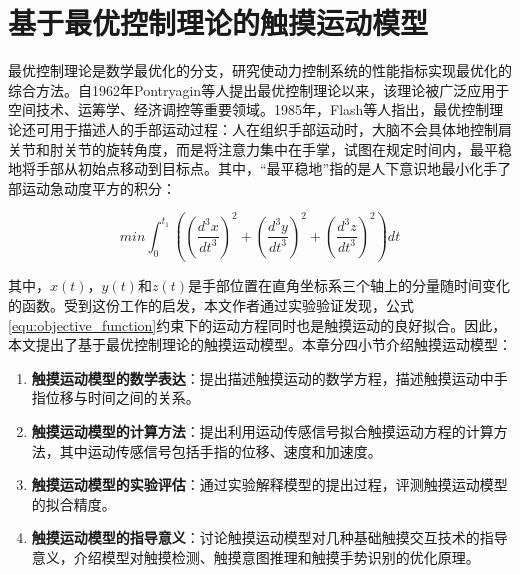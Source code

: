
\chapter{基于最优控制理论的触摸运动模型}\label{section:model}

最优控制理论是数学最优化的分支，研究使动力控制系统的性能指标实现最优化的综合方法。自1962年Pontryagin等人提出最优控制理论以来\cite{kopp1962pontryagin}，该理论被广泛应用于空间技术\cite{lewis2012optimal}、运筹学\cite{ross2020optimal}、经济调控\cite{kamien2012dynamic, ross2016nonsmooth}等重要领域。1985年，Flash等人指出，最优控制理论还可用于描述人的手部运动过程：人在组织手部运动时，大脑不会具体地控制肩关节和肘关节的旋转角度，而是将注意力集中在手掌，试图在规定时间内，最平稳地将手部从初始点移动到目标点。其中，“最平稳地”指的是人下意识地最小化手了部运动急动度平方的积分：

\begin{equation}
	min\int_{0}^{t_1}\left(\left(\frac{d^3x}{dt^3}\right)^2+\left(\frac{d^3y}{dt^3}\right)^2+\left(\frac{d^3z}{dt^3}\right)^2\right)dt
	\label{equ:objective_function}
\end{equation}

其中，$x(t)$，$y(t)$和$z(t)$是手部位置在直角坐标系三个轴上的分量随时间变化的函数。受到这份工作的启发，本文作者通过实验验证发现，公式\ref{equ:objective_function}约束下的运动方程同时也是触摸运动的良好拟合。因此，本文提出了基于最优控制理论的触摸运动模型。本章分四小节介绍触摸运动模型：

\begin{enumerate}
\item \textbf{触摸运动模型的数学表达}：提出描述触摸运动的数学方程，描述触摸运动中手指位移与时间之间的关系。
\item \textbf{触摸运动模型的计算方法}：提出利用运动传感信号拟合触摸运动方程的计算方法，其中运动传感信号包括手指的位移、速度和加速度。
\item \textbf{触摸运动模型的实验评估}：通过实验解释模型的提出过程，评测触摸运动模型的拟合精度。
\item \textbf{触摸运动模型的指导意义}：讨论触摸运动模型对几种基础触摸交互技术的指导意义，介绍模型对触摸检测、触摸意图推理和触摸手势识别的优化原理。
\end{enumerate}


